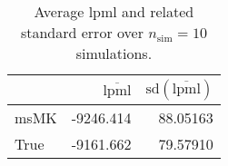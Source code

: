 \begin{table}[H]

\caption{Average lpml and related standard error over $n_{\text{sim}} = 10$ simulations.}
\centering
\begin{tabular}[t]{lrr}
\toprule
  & $\overbar{\text{lpml}}$ & $\text{sd}(\overbar{\text{lpml}})$\\
\midrule
msMK & -9246.414 & 88.05163\\
True & -9161.662 & 79.57910\\
\bottomrule
\end{tabular}
\end{table}